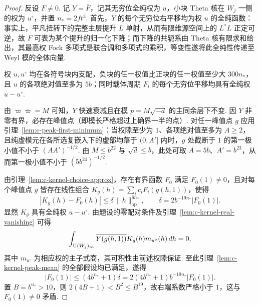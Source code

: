 \begin{proof}
反设 $F\ne0$. 记 $Y=\bar F$，记其无穷位全纯权为 $u$，小块 Theta 核在 $W_j$ 一侧的权为 $u^\circ$，并置 $n_*=2ft^3$. 首先，$Y$ 的每个无穷位右平移均为权 $u$ 的全纯函数：事实上，平凡扭转下的完整主层提升 $L$ 单射，从而有限维源空间上的 $L^*L$ 正定可逆，故 $F$ 可表为某个提升的归一化下降；而下降的共轭系由 Theta 核有限求和给出，其最高权 Fock 多项式是联合调和多项式的乘积，等变性遂将此全纯性传递至 Weyl 模的全体向量.

权 $u,u^\circ$ 均在各符号块内支配，负块的任一权值比正块的任一权值至少大 $300n_*$，且 $u$ 的各项绝对值至多为 $5b$；同时载体周期 $F_i$ 的每个无穷位平移均具有全纯权 $u-u^\circ$.

由 $\varpi\overline{\varpi}=M$ 可知，$Y$ 快速衰减且在模 $p=M\sqrt{-d}$ 的主同余层下不变. 因 $Y$ 非零有界，必存在峰值点（即模长严格超过上确界一半的点）. 对任一峰值点 $g$ 应用引理~\ref{lem:c-peak-first-minimum}：当权隙至少为 $1$、各项绝对值至多为 $A\ge2$，且纯虚模元在各所选复嵌入下的虚部均落于 $(0,A']$ 内时，$g$ 处截断于 $1$ 的第一极小值不小于 $(AA')^{-1/2}$. 由 $M\le b^{22}$ 与 $\sqrt d\le b$，此处可取 $A=5b$、$A'=b^{23}$，从而第一极小值不小于 $(5b^{24})^{-1/2}$.

由引理~\ref{lem:c-kernel-choice-approx}，存在有界函数 $F_0$ 满足 $F_0(1)\ne0$，且对每个峰值点 $g$ 皆存在线性组合 $K_g(h)=\sum_i c_iF_i(g(h,1))$，使得
\[
 |K_g(h)-F_0(h)|\le \delta\,\|h\|_{\mathrm{op}}^{6n_*},
 \qquad \delta=2b^{-19n_*}|F_0(1)|.
\]
显然 $K_g$ 具有全纯权 $u-u^\circ$. 由题设的零配对条件及引理~\ref{lem:c-kernel-real-vanishing} 可得
\[
 \int_{\operatorname{U}(W_j)_\infty}
  \overline{Y(g(h,1))}K_g(h)m_{u^\circ}(h)\,dh=0,
\]
其中 $m_{u^\circ}$ 为相应权的主子式商，其可积性由前述权隙保证. 至此引理~\ref{lem:c-kernel-peak-mean} 的全部假设均已满足，遂得
\[
 |F_0(1)|\le(4b^{n_*}+1)\delta
      =2(4b^{n_*}+1)b^{-19n_*}|F_0(1)|.
\]
置 $B=b^{n_*}>10$，则 $2(4B+1)<B^2\le B^{19}$，故右端系数严格小于 $1$，这与 $F_0(1)\ne0$ 矛盾.
\end{proof}

